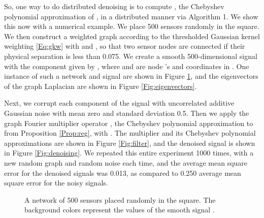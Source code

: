 \documentclass[conference]{IEEEtran}
\begin{document}
So, one way to do distributed denoising is to compute , the Chebyshev polynomial approximation of , in a distributed manner via Algorithm 1. We show this now with a numerical example.
We place 500 sensors randomly in the  square. We then construct a weighted graph according to the thresholded Gaussian kernel weighting \eqref{Eq:gkw} with  and , so that two sensor nodes are connected if their physical separation is less than 0.075. We create a smooth 500-dimensional signal with the  component given by
,
where  and  are node 's  and  coordinates in . One instance of such a network and signal  are shown in Figure \ref{Fig:network}, and the eigenvectors of the graph Laplacian are shown in Figure \ref{Fig:eigenvectors}.

Next, we corrupt each component of the signal  with uncorrelated additive Gaussian noise with mean zero and standard deviation 0.5. Then we apply the graph Fourier multiplier operator , the Chebyshev polynomial approximation to  from Proposition \ref{Prop:reg}, with . The multiplier and its Chebyshev polynomial approximations are shown in Figure \ref{Fig:filter}, and the denoised signal  is shown in Figure \ref{Fig:denoising}. We repeated this entire experiment 1000 times, with a new random graph and random noise each time, and the average mean square error for the denoised signals was 0.013, as compared to 0.250 average mean square error for the noisy signals.
\begin{figure}
\caption{A network of 500 sensors placed randomly in the  square. The background colors represent the values of the smooth signal . } \label{Fig:network} \end{figure}
\end{document}
